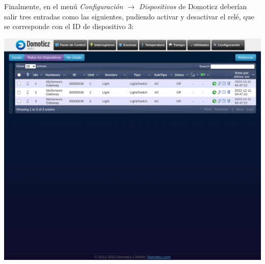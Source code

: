 Finalmente, en el menú \emph{Configuración $\rightarrow$ Dispositivos} de
Domoticz deberían salir tres entradas como las siguientes, pudiendo activar y
desactivar el relé, que se corresponde con el ID de dispositivo 3:

\includegraphics[width=\linewidth]{nodo1/nodo1-domoticz.png}